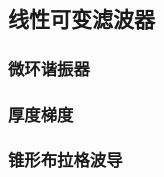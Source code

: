 \documentclass[9 pt,makeindex]{beamer}
\begin{document}
\subsection{线性可变滤波器}
\subsubsection{微环谐振器}

\subsubsection{厚度梯度}

\subsubsection{锥形布拉格波导}





\printindex
\end{document}
